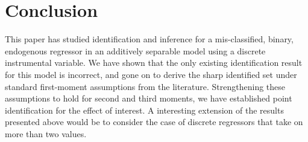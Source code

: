 \section{Conclusion}
\label{sec:conclusion}

This paper has studied identification and inference for a mis-classified, binary, endogenous regressor in an additively separable model using a discrete instrumental variable.
We have shown that the only existing identification result for this model is incorrect, and gone on to derive the sharp identified set under standard first-moment assumptions from the literature.
Strengthening these assumptions to hold for second and third moments, we have established point identification for the effect of interest.
A interesting extension of the results presented above would be to consider the case of discrete regressors that take on more than two values.
